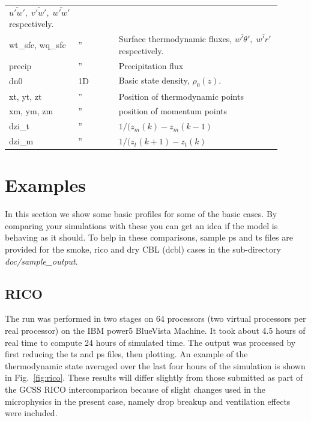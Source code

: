 \documentclass[11pt,a4paper]{article}
\begin{document}
\begin{longtable}[htb]{p{0.15\linewidth}p{0.15\linewidth}p{0.6\linewidth}}
$\overline{u'w'}, \;\overline{v'w'}, \;\overline{w'w'} $
respectively. \\  
wt\_sfc, wq\_sfc & '' & Surface thermodynamic fluxes,
$\overline{w'\theta'}, \;\overline{w'r'} $
respectively. \\
precip & '' &  Precipitation flux \\
dn0    & 1D &  Basic state density, $\rho_0(z).$ \\
xt, yt, zt & '' & Position of thermodynamic points \\
xm, ym, zm & '' & position of momentum points \\
dzi\_t        & '' & $1/(z_m(k) - z_m(k-1)$ \\
dzi\_m        & '' & $1/(z_t(k+1) - z_t(k)$ \\
\hline \hline
\end{longtable}

\section{Examples}
In this section we show some basic profiles for some of the basic cases.
By comparing your simulations with these you can get an idea if the
model is behaving as it should. To help in these comparisons, sample
ps and ts files are provided for the smoke, rico and dry CBL (dcbl)
cases in the sub-directory \emph{doc/sample\_output}.

\subsection{RICO}
The run was performed in two stages on 64 processors
(two virtual processors per real processor) on the IBM
power5 BlueVista Machine. It took about 4.5 hours of real
time to compute 24 hours of simulated time.
The output was processed by first reducing the ts and ps files, then plotting.
An example of the thermodynamic state averaged over the last four hours
of the simulation is shown in Fig.~\ref{fig:rico}. These results will
differ slightly from those submitted as part of the GCSS RICO
intercomparison because of slight changes used in the microphysics in
the present case, namely drop breakup and ventilation effects were
included.
\end{document}
